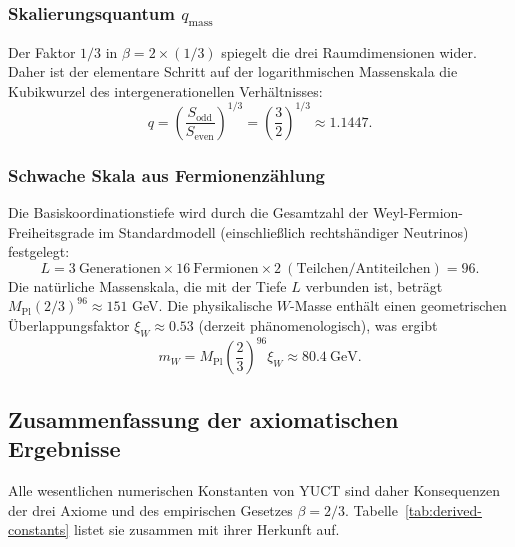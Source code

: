 \documentclass[11pt,a4paper]{article}
\begin{document}
	\subsubsection{Skalierungsquantum \(q_{\text{mass}}\)}
	Der Faktor \(1/3\) in \(\beta = 2 \times (1/3)\) spiegelt die drei Raumdimensionen wider. Daher ist der elementare Schritt auf der logarithmischen Massenskala die Kubikwurzel des intergenerationellen Verhältnisses:
	\[
	\boxed{q = \left(\frac{S_{\mathrm{odd}}}{S_{\mathrm{even}}}\right)^{1/3} = \left(\frac{3}{2}\right)^{1/3} \approx 1.1447}.
	\]
	
	\subsubsection{Schwache Skala aus Fermionenzählung}
	Die Basiskoordinationstiefe wird durch die Gesamtzahl der Weyl-Fermion-Freiheitsgrade im Standardmodell (einschließlich rechtshändiger Neutrinos) festgelegt:
	\[
	L = 3\ \text{Generationen} \times 16\ \text{Fermionen} \times 2\ (\text{Teilchen/Antiteilchen}) = 96.
	\]
	Die natürliche Massenskala, die mit der Tiefe \(L\) verbunden ist, beträgt \(M_{\mathrm{Pl}} (2/3)^{96} \approx 151\) GeV. Die physikalische \(W\)-Masse enthält einen geometrischen Überlappungsfaktor \(\xi_W \approx 0.53\) (derzeit phänomenologisch), was ergibt
	\[
	m_W = M_{\mathrm{Pl}} \left(\frac{2}{3}\right)^{96} \xi_W \approx 80.4\ \text{GeV}.
	\]
	
	\subsection{Zusammenfassung der axiomatischen Ergebnisse}
	
	Alle wesentlichen numerischen Konstanten von YUCT sind daher Konsequenzen der drei Axiome und des empirischen Gesetzes \(\beta=2/3\). Tabelle~\ref{tab:derived-constants} listet sie zusammen mit ihrer Herkunft auf.
	
\end{document}
